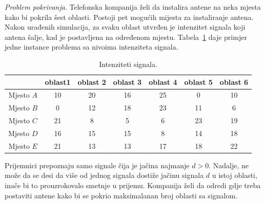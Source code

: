 \documentclass[a4paper, utf8, 11pt, colorlinks]{book}
\begin{document}
\emph{Problem pokrivanja}. Telefonska kompanija želi da instalira antene na neka mjesta kako bi pokrila šest oblasti. Postoji pet mogućih mijesta za instaliranje antena. Nakon urađenih simulacija, za svaku oblast utvrđen je intenzitet signala koji antena šalje, kad je postavljena na određenom mjestu. Tabela~\ref{tab:tb-3} daje   primjer jedne instance problema sa nivoima intenziteta signala.

\begin{table}[!ht]
	\centering
	\begin{tabular}{c|cccccc} \hline
		\              & oblast1 & oblast 2 & oblast 3 & oblast 4 & oblast 5 & oblast 6 \\ \hline
		Mjesto $A$     & 10  & 20 & 16 & 25 & 0   & 10   \\
		Mjesto $B$     & 0   & 12 & 18 &  23 & 11 & 6   \\
		Mjesto $C$     & 21  &  8 & 5  &  6 & 23  &  19 \\
		Mjesto $D$    &  16 &  15 & 15 &  8 & 14 & 18   \\
		Mjesto $E $    &  21 & 13 & 13 & 17 & 18  & 22    \\ \hline
	\end{tabular}
	\caption{Intenziteti signala.}
	\label{tab:tb-3}
\end{table}

Prijemnici prepoznaju samo signale čija je jačina najmanje   $d>0$. Nadalje, ne može da se desi da više od jednog signala  dostiže jačinu signala $d$ u istoj oblasti, inače bi to prouzrokovalo smetnje u prijemu. %
Kompanija želi da odredi gdje treba postaviti antene kako bi se pokrio maksimalanan broj oblasti sa signalom. 
\end{document}
